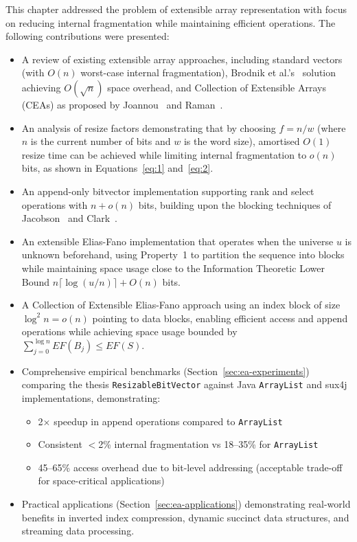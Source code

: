 This chapter addressed the problem of extensible array representation with focus on reducing internal fragmentation while maintaining efficient operations. The following contributions were presented:

\begin{itemize}
    \item A review of existing extensible array approaches, including standard vectors (with $O(n)$ worst-case internal fragmentation), Brodnik et al.'s~\cite{Brodnik_1999} solution achieving $O(\sqrt{n})$ space overhead, and Collection of Extensible Arrays (CEAs) as proposed by Joannou~\cite{Stelios_2001} and Raman~\cite{Raman_2001}.

    \item An analysis of resize factors demonstrating that by choosing $f = n/w$ (where $n$ is the current number of bits and $w$ is the word size), amortised $O(1)$ resize time can be achieved while limiting internal fragmentation to $o(n)$ bits, as shown in Equations~\ref{eq:1} and~\ref{eq:2}.

    \item An append-only bitvector implementation supporting rank and select operations with $n + o(n)$ bits, building upon the blocking techniques of Jacobson~\cite{Jacobson_1989} and Clark~\cite{Clark_1998}.

    \item An extensible Elias-Fano implementation that operates when the universe $u$ is unknown beforehand, using Property~1 to partition the sequence into blocks while maintaining space usage close to the Information Theoretic Lower Bound $n\lceil \log(u/n) \rceil + O(n)$ bits.

    \item A Collection of Extensible Elias-Fano approach using an index block of size $\log^2 n = o(n)$ pointing to data blocks, enabling efficient access and append operations while achieving space usage bounded by $\sum_{j=0}^{\log n} EF(B_j) \leq EF(S)$.

    \item Comprehensive empirical benchmarks (Section~\ref{sec:ea-experiments}) comparing the thesis \texttt{ResizableBitVector} against Java \texttt{ArrayList} and sux4j implementations, demonstrating:
    \begin{itemize}
        \item 2$\times$ speedup in append operations compared to \texttt{ArrayList}
        \item Consistent $<$2\% internal fragmentation vs 18--35\% for \texttt{ArrayList}
        \item 45--65\% access overhead due to bit-level addressing (acceptable trade-off for space-critical applications)
    \end{itemize}

    \item Practical applications (Section~\ref{sec:ea-applications}) demonstrating real-world benefits in inverted index compression, dynamic succinct data structures, and streaming data processing.
\end{itemize}

